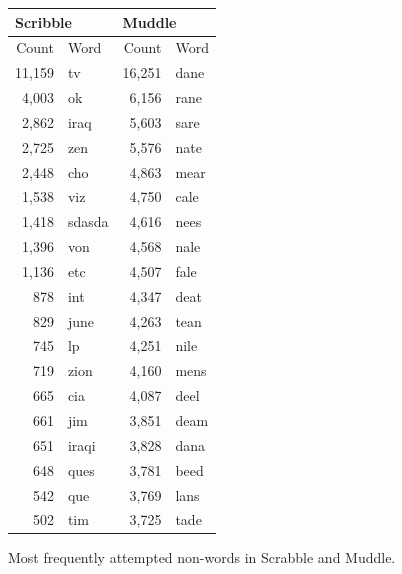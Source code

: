 \documentclass[twocolumn]{article}
\begin{document}
\begin{figure}
\begin{center}
\begin{tabular}{|rl@{\qquad}rl|}
\multicolumn{2}{l}{{\bf \large Scribble}} &
\multicolumn{2}{l}{{\bf \large Muddle}} \\
\hline
Count & Word & Count & Word \\
\hline
11,159 &  tv         &     16,251 &  dane    \\
4,003  &  ok         &     6,156  &  rane    \\
2,862  &  iraq       &     5,603  &  sare    \\
2,725  &  zen        &     5,576  &  nate    \\
2,448  &  cho        &     4,863  &  mear    \\
1,538  &  viz        &     4,750  &  cale    \\
1,418  &  sdasda     &     4,616  &  nees    \\
1,396  &  von        &     4,568  &  nale    \\
1,136  &  etc        &     4,507  &  fale    \\
878    &  int        &     4,347  &  deat    \\
829    &  june       &     4,263  &  tean    \\
745    &  lp         &     4,251  &  nile    \\
719    &  zion       &     4,160  &  mens    \\
665    &  cia        &     4,087  &  deel    \\
661    &  jim        &     3,851  &  deam    \\
651    &  iraqi      &     3,828  &  dana    \\
648    &  ques       &     3,781  &  beed    \\
542    &  que        &     3,769  &  lans    \\
502    &  tim        &     3,725  &  tade    \\
\hline
\end{tabular}
\end{center}
\caption{Most frequently attempted non-words in Scrabble and Muddle.}
\label{fig:mostfrequentfake}
\end{figure}
\end{document}
